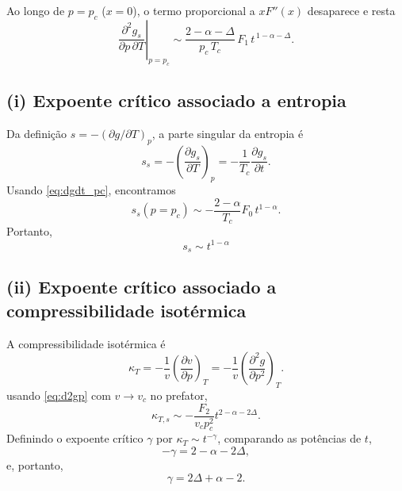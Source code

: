 \documentclass[11pt,a4paper]{article}
\newcommand{\pd}[2]{\frac{\partial #1}{\partial #2}}
\begin{document}
%
Ao longo de \(p=p_c\) (\(x=0\)), o termo proporcional a \(x F''(x)\)
desaparece e resta
%
\begin{equation}
    \left.\frac{\partial^{2} g_s}{\partial p\,\partial T}\right|_{p=p_c}
    \sim
    \frac{2-\alpha-\Delta}{p_c\,T_c}\,
    F_1\,t^{\,1-\alpha-\Delta}.
    \label{eq:d2gpt}
\end{equation}
%
\subsection*{(i) Expoente crítico associado a entropia}
%
Da definição \(s=-(\partial g/\partial T)_p\), a parte singular da entropia é
%
\begin{equation}
    s_s
    =-\left(\frac{\partial g_s}{\partial T}\right)_p
    =-\frac{1}{T_c}\pd{g_s}{t}.
\end{equation}
%
Usando \eqref{eq:dgdt_pc}, encontramos
%
\begin{equation}
    s_s(p=p_c)
    \sim
    -\frac{2-\alpha}{T_c}F_0\,t^{1-\alpha}.
    \label{eq:entropy_scaling}
\end{equation}
%
Portanto,
%
\begin{equation}
    \boxed{s_s\sim t^{1-\alpha}}
\end{equation}
%
\subsection*{(ii) Expoente crítico associado a compressibilidade isotérmica}
A compressibilidade isotérmica é
%
\begin{equation}
    \kappa_T
    =-\frac{1}{v}
    \left(\frac{\partial v}{\partial p}\right)_T
    =-\frac{1}{v}\left(\frac{\partial^2 g}{\partial p^2}\right)_T.
\end{equation}
%
usando \eqref{eq:d2gp} com \(v\to v_c\) no prefator,
%
\begin{equation}
    \kappa_{T,s}
    \sim
    -\frac{F_2}{v_c p_c^2}
    t^{2-\alpha-2\Delta}.
\end{equation}
%
Definindo o expoente crítico \(\gamma\) por \(\kappa_T\sim t^{-\gamma}\),
comparando as potências de \(t\),
%
\begin{equation}
    -\gamma=2-\alpha-2\Delta,
\end{equation}
%
e, portanto,
%
\begin{equation}
    \boxed{
    \gamma=2\Delta+\alpha-2.
    }
    \label{eq:gamma}
\end{equation}
%
\end{document}
